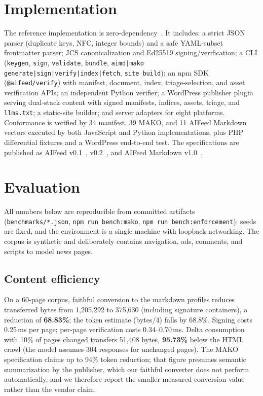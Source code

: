 \documentclass[11pt]{article}
\newcommand{\aifeed}{AIFeed}
\newcommand{\aimd}{AIFeed Markdown}
\newcommand{\mako}{MAKO}
\newcommand{\code}[1]{\texttt{#1}}
\begin{document}
\section{Implementation}

The reference implementation is zero-dependency~\citep{aifeedRepo}. It includes: a strict
JSON parser (duplicate keys, NFC, integer bounds) and a safe YAML-subset frontmatter
parser; JCS canonicalization and Ed25519 signing/verification; a CLI (\code{keygen},
\code{sign}, \code{validate}, \code{bundle},
\code{aimd|mako generate|sign|verify|index|fetch}, \code{site build}); an npm SDK
(\code{@aifeed/verify}) with manifest, document, index, triage-selection, and asset
verification APIs; an
independent Python verifier; a WordPress publisher plugin serving dual-stack content with
signed manifests, indices, assets, triage, and \code{llms.txt}; a static-site builder;
and server adapters for eight platforms. Conformance is verified by 34 manifest, 39
\mako{}, and 11 \aimd{} vectors executed by both JavaScript and Python implementations,
plus PHP differential fixtures and a WordPress end-to-end test. The specifications are
published as \aifeed{} v0.1~\citep{aifeedSpec01}, v0.2~\citep{aifeedSpec02}, and
\aimd{} v1.0~\citep{aimdSpec}.

\section{Evaluation}
\label{sec:eval}

All numbers below are reproducible from committed artifacts
(\code{benchmarks/*.json}, \code{npm run bench:mako}, \code{npm run bench:enforcement});
seeds are fixed, and the environment is a single machine with loopback networking. The
corpus is synthetic and deliberately contains navigation, ads, comments, and scripts to
model news pages.

\subsection{Content efficiency}

On a 60-page corpus, faithful conversion to the markdown profiles reduces transferred
bytes from 1{,}205{,}292 to 375{,}630 (including signature containers), a reduction of
\textbf{68.83\%}; the token estimate (bytes/4) falls by 68.8\%. Signing costs 0.25\,ms per
page; per-page verification costs 0.34--0.70\,ms. Delta consumption with 10\% of pages
changed transfers 51{,}408 bytes, \textbf{95.73\%} below the HTML crawl (the model
assumes 304 responses for unchanged pages). The \mako{} specification claims up to 94\%
token reduction; that figure presumes semantic summarization by the publisher, which our
faithful converter does not perform automatically, and we therefore report the smaller
measured conversion value rather than the vendor claim.
\end{document}
